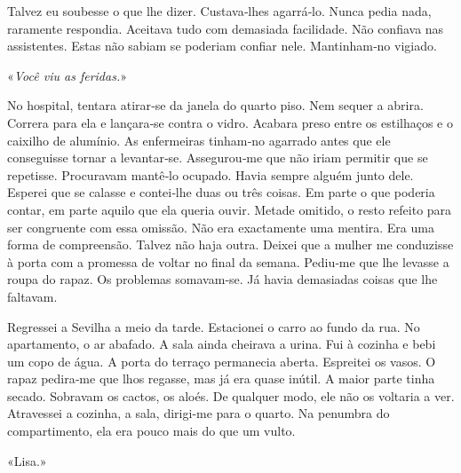 Talvez eu soubesse o que lhe dizer. Custava­‑lhes agarrá­‑lo. Nunca
pedia nada, raramente respondia. Aceitava tudo com demasiada facilidade.
Não confiava nas assistentes. Estas não sabiam se poderiam confiar nele.
Mantinham­‑no vigiado.

«\emph{Você viu as feridas.}»

No hospital, tentara atirar­‑se da janela do quarto piso. Nem sequer a
abrira. Correra para ela e lançara­‑se contra o vidro. Acabara preso
entre os estilhaços e o caixilho de alumínio. As enfermeiras tinham­‑no
agarrado antes que ele conseguisse tornar a levantar­‑se. Assegurou­‑me
que não iriam permitir que se repetisse. Procuravam mantê­‑lo ocupado.
Havia sempre alguém junto dele. Esperei que se calasse e contei­‑lhe
duas ou três coisas. Em parte o que poderia contar, em parte aquilo que
ela queria ouvir. Metade omitido, o resto refeito para ser congruente
com essa omissão. Não era exactamente uma mentira. Era uma forma de
compreensão. Talvez não haja outra. Deixei que a mulher me conduzisse à
porta com a promessa de voltar no final da semana. Pediu­‑me que lhe
levasse a roupa do rapaz. Os problemas somavam­‑se. Já havia demasiadas
coisas que lhe faltavam.

Regressei a Sevilha a meio da tarde. Estacionei o carro ao fundo da rua.
No apartamento, o ar abafado. A sala ainda cheirava a urina. Fui à
cozinha e bebi um copo de água. A porta do terraço permanecia aberta.
Espreitei os vasos. O rapaz pedira­‑me que lhos regasse, mas já era
quase inútil. A maior parte tinha secado. Sobravam os cactos, os aloés.
De qualquer modo, ele não os voltaria a ver. Atravessei a cozinha, a
sala, dirigi­‑me para o quarto. Na penumbra do compartimento, ela era
pouco mais do que um vulto.

«Lisa.»

